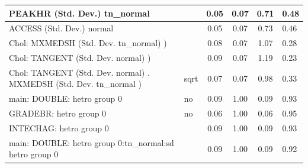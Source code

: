 \begin{table}
\begin{center}
\begin{tabular}{|l|l|c|c|c|l|}
			\hline
			PEAKHR (Std. Dev.) tn_normal &  & 0.05 & 0.07 & 0.71 & 0.48 \\
			\hline
			ACCESS (Std. Dev.) normal &  & 0.05 & 0.07 & 0.73 & 0.46 \\
			\hline
			 Chol: MXMEDSH (Std. Dev. tn_normal) ) &  & 0.08 & 0.07 & 1.07 & 0.28 \\
			\hline
			 Chol: TANGENT (Std. Dev. normal) ) &  & 0.09 & 0.07 & 1.19 & 0.23 \\
			\hline
			 Chol: TANGENT (Std. Dev. normal) . MXMEDSH (Std. Dev.   tn_normal ) & sqrt & 0.07 & 0.07 & 0.98 & 0.33 \\
			\hline
			main: DOUBLE: hetro group 0 & no & 0.09 & 1.00 & 0.09 & 0.93 \\
			\hline
			GRADEBR: hetro group 0 & no & 0.06 & 1.00 & 0.06 & 0.95 \\
			\hline
			INTECHAG: hetro group 0 &  & 0.09 & 1.00 & 0.09 & 0.93 \\
			\hline
			main: DOUBLE: hetro group 0:tn_normal:sd  hetro group 0 &  & 0.09 & 1.00 & 0.09 & 0.92 \\
			\hline
		\end{tabular}
	\end{center}
\end{table}